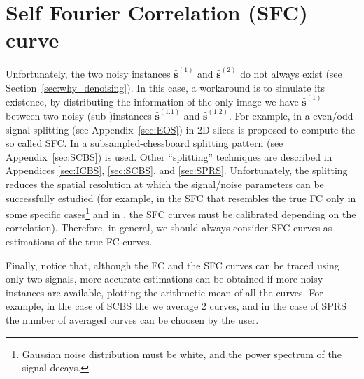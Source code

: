 
\section{Self Fourier Correlation (SFC) curve}

Unfortunately, the two noisy instances $\hat{\mathbf{s}}^{(1)}$ and
$\hat{\mathbf{s}}^{(2)}$ do not always exist (see
Section~\ref{sec:why_denoising}).  In this case, a workaround is to
simulate its existence, by distributing the information of the only
image we have $\hat{\mathbf{s}}^{(1)}$ between two noisy
(sub-)instances $\hat{\mathbf{s}}^{(1.1)}$ and
$\hat{\mathbf{s}}^{(1.2)}$. For example, in \cite{verbeke2024self} a
even/odd signal splitting (see Appendix~\ref{sec:EOS}) in 2D slices is
proposed to compute the so called \gls{SFC}. In \cite{koho2019fourier}
a subsampled-chessboard splitting pattern (see
Appendix~\ref{sec:SCBS}) is used. Other ``splitting'' techniques are
described in Appendices \ref{sec:ICBS}, \ref{sec:SCBS}, and
\ref{sec:SPRS}. Unfortunately, the splitting reduces the spatial
resolution at which the signal/noise parameters can be successfully
estudied (for example, in \cite{verbeke2024self} the \gls{SFC} that
resembles the true \gls{FC} only in some specific cases\footnote{Gaussian
  noise distribution must be white, and the power spectrum of the
  signal decays.} and in \cite{koho2019fourier}, the \gls{SFC} curves
must be calibrated depending on the correlation). Therefore, in
general, we should always consider \gls{SFC} curves as estimations of
the true \gls{FC} curves.

Finally, notice that, although the \gls{FC} and the \gls{SFC} curves
can be traced using only two signals, more accurate estimations can be
obtained if more noisy instances are available, plotting the arithmetic mean
of all the curves. For example, in the case of SCBS the we average 2
curves, and in the case of SPRS the number of averaged curves can be
choosen by the user.

\begin{comment}
Finally, notice that it is possible to compute the so called Self FC
(SFC in general, specifically SFSC for the 3D case and SFRC for the 2D
one), using some technique to simulate the existence of (at
least\footnote{When it is possible to use more instances, the
  resulting curve is the mean of all the curves.}) two
``noisy''\footnote{In real scenarios, where it is possible to take two
  (or more) captures of the same view, the only that should
  distinguish the instances is the noise. Notice that, if the views
  were different, the uncorrelated noise is also present.} instances,
$\hat{\mathbf{X}}^{(1)}$ and $\hat{\mathbf{X}}^{(2)}$. For example, in
\cite{verbeke2024self} a even/odd signal splitting (see
Appendix~\ref{sec:EOS}) in 2D slices is proposed to compute the SFC
that resembles the true FC in some specific cases. In
\cite{koho2019fourier} a subsampled-chessboard splitting pattern (see
Appendix~\ref{sec:SCBS}) is used to compute SFC curves. Notice that,
to resemble the true FC curves, they must be calibrated for some
correlation threshold.
\end{comment}

